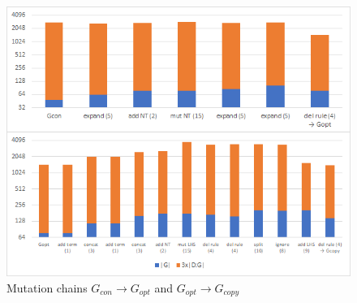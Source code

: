 \documentclass{article}
\begin{document}
\begin{figure}[t]\centering
\includegraphics[width=.85\textwidth]{chains.png}
\caption{Mutation chains $G_{con} \rightarrow G_{opt}$ and $G_{opt} \rightarrow G_{copy}$}
\label{fig:chains}
\end{figure}
\end{document}
